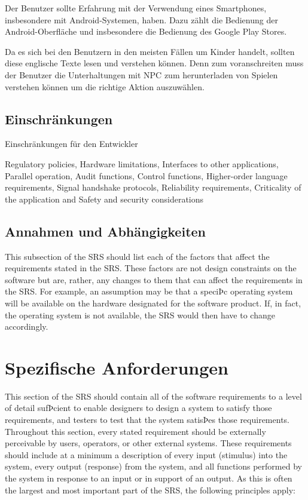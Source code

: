 		Der Benutzer sollte Erfahrung mit der Verwendung eines Smartphones, insbesondere mit Android-Systemen, haben. Dazu zählt die Bedienung der Android-Oberfläche und insbesondere die Bedienung des Google Play Stores.
		
		Da es sich bei den Benutzern in den meisten Fällen um Kinder handelt, sollten diese englische Texte lesen und verstehen können. Denn zum voranschreiten muss der Benutzer die Unterhaltungen mit NPC zum herunterladen von Spielen verstehen können um die richtige Aktion auszuwählen.
	
	\subsection{Einschränkungen} 
		Einschränkungen für den Entwickler
				
		Regulatory policies, Hardware limitations, Interfaces to other applications, Parallel operation, Audit functions, Control functions, Higher-order language requirements, Signal handshake protocols, Reliability requirements, Criticality of the application and Safety and security considerations
	
	\subsection{Annahmen und Abhängigkeiten}
		This subsection of the SRS should list each of the factors that affect the requirements stated in the SRS. These factors are not design constraints on the software but are, rather, any changes to them that can affect the requirements in the SRS. For example, an assumption may be that a speciÞc operating system will be available on the hardware designated for the software product. If, in fact, the operating system is not available, the SRS would then have to change accordingly.

\section{Spezifische Anforderungen}
	This section of the SRS should contain all of the software requirements to a level of detail sufÞcient to enable designers to design a system to satisfy those requirements, and testers to test that the system satisÞes those requirements. Throughout this section, every stated requirement should be externally perceivable by users, operators, or other external systems. These requirements should include at a minimum a description of
every input (stimulus) into the system, every output (response) from the system, and all functions performed by the system in response to an input or in support of an output. As this is often the largest and most important part of the SRS, the following principles apply:

